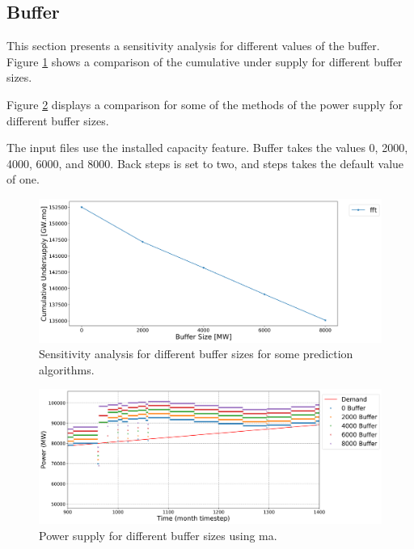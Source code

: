 \documentclass[11pt]{article}
\begin{document}
\subsection{Buffer}

This section presents a sensitivity analysis for different values of the buffer. Figure \ref{fig:30-buff} shows a comparison of the cumulative under supply for different buffer sizes.

Figure \ref{fig:30-buf-fft} displays a comparison for some of the methods of the power supply for different buffer sizes.

The input files use the installed capacity feature. Buffer takes the values 0, 2000, 4000, 6000, and 8000. Back steps is set to two, and steps takes the default value of one.

\begin{figure}[H]
	\centering
	\includegraphics[width=\textwidth]{30-figures/30-sens-buffer.png} 
	\hfill
	\caption{Sensitivity analysis for different buffer sizes for some prediction algorithms.}
	\label{fig:30-buff}
\end{figure}

\begin{figure}[H]
	\centering
	\includegraphics[width=\textwidth]{30-figures/30-power-buffer-fft.png} 
	\hfill
	\caption{Power supply for different buffer sizes using ma.}
	\label{fig:30-buf-fft}
\end{figure}
\end{document}
